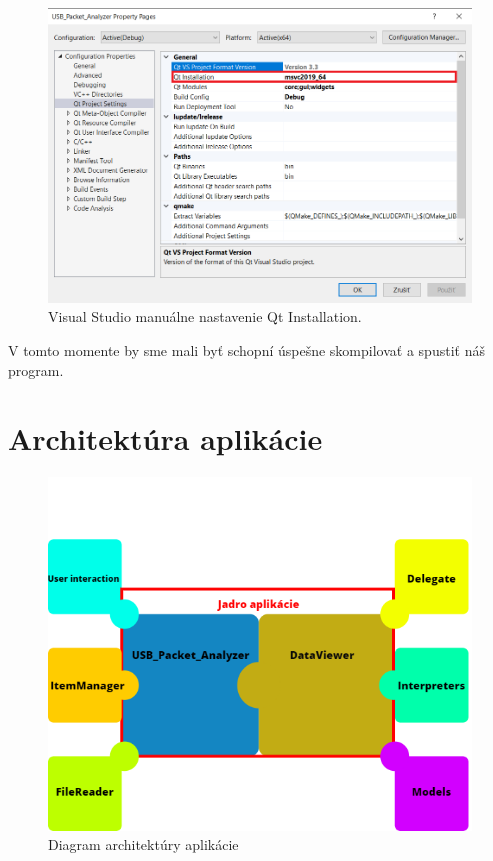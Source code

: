 \begin{figure}[!htb]
	\centering
	\includegraphics[width=12cm]{img/kap04_vs_manual}
	\caption{Visual Studio manuálne nastavenie Qt Installation.}
	\label{obr:kap4:vs_manual}
\end{figure}

V tomto momente by sme mali byť schopní úspešne skompilovať a spustiť náš program.

\newpage

\section{Architektúra aplikácie}

\begin{figure}[!htb]
	\centering
	\includegraphics[width=\textwidth]{img/kap04_architektura}
	\caption{Diagram architektúry aplikácie}
	\label{obr:kap4:architek}
\end{figure}

